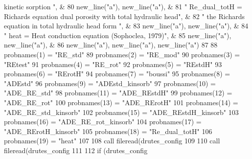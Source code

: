 \begin{DoxyCode}
{       kinetic sorption "}\textcolor{comment}{, &}
80 \textcolor{comment}{        new\_line(}\textcolor{stringliteral}{"a"}),  new\_line(\textcolor{stringliteral}{"a"}), &
81         \textcolor{stringliteral}{"   Re\_dual\_totH = Richards equation dual porosity with total hydraulic head"}\textcolor{comment}{, &}
82 \textcolor{comment}{        }\textcolor{stringliteral}{" the Richards equation in total hydraulic head form "}, &
83         new\_line(\textcolor{stringliteral}{"a"}),  new\_line(\textcolor{stringliteral}{"a"}), &
84         \textcolor{stringliteral}{"   heat = Heat conduction equation (Sophoclea, 1979)"}, &
85         new\_line(\textcolor{stringliteral}{"a"}),  new\_line(\textcolor{stringliteral}{"a"}), &
86         new\_line(\textcolor{stringliteral}{"a"}),  new\_line(\textcolor{stringliteral}{"a"}), new\_line(\textcolor{stringliteral}{"a"})
87         
88         probnames(1) = \textcolor{stringliteral}{"RE\_std"}
89         probnames(2) = \textcolor{stringliteral}{"RE\_mod"}
90         probnames(3) = \textcolor{stringliteral}{"REtest"}
91         probnames(4) = \textcolor{stringliteral}{"RE\_rot"}
92         probnames(5) = \textcolor{stringliteral}{"REstdH"}
93         probnames(6) = \textcolor{stringliteral}{"RErotH"}
94         probnames(7) = \textcolor{stringliteral}{"boussi"}
95         probnames(8) = \textcolor{stringliteral}{"ADEstd"}
96         probnames(9) = \textcolor{stringliteral}{"ADEstd\_kinsorb"}
97         probnames(10) = \textcolor{stringliteral}{"ADE\_RE\_std"}
98         probnames(11) = \textcolor{stringliteral}{"ADE\_REstdH"}
99         probnames(12) = \textcolor{stringliteral}{"ADE\_RE\_rot"}
100         probnames(13) = \textcolor{stringliteral}{"ADE\_RErotH"}
101         probnames(14) = \textcolor{stringliteral}{"ADE\_RE\_std\_kinsorb"}
102         probnames(15) = \textcolor{stringliteral}{"ADE\_REstdH\_kinsorb"}
103         probnames(16) = \textcolor{stringliteral}{"ADE\_RE\_rot\_kinsorb"}
104         probnames(17) = \textcolor{stringliteral}{"ADE\_RErotH\_kinsorb"}
105         probnames(18) = \textcolor{stringliteral}{"Re\_dual\_totH"} 
106         probnames(19) = \textcolor{stringliteral}{"heat"}
107         
108       \textcolor{keyword}{call }fileread(drutes_config%
109 \textcolor{comment}{}
110 \textcolor{comment}{      }\textcolor{keyword}{call }fileread(drutes_config%
111 \textcolor{comment}{      }
112 \textcolor{comment}{      }\textcolor{keywordflow}{if} (drutes_config%

\end{DoxyCode}

